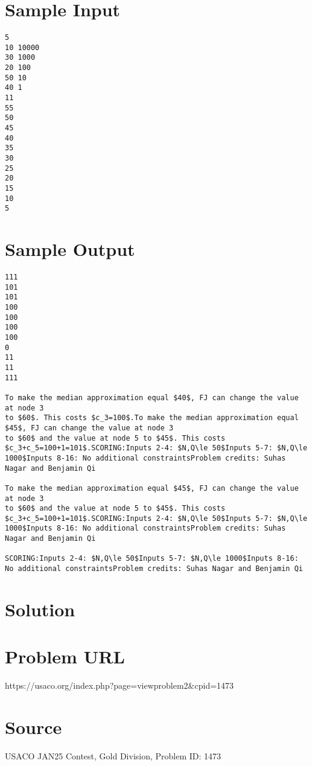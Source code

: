 \documentclass[12pt]{article}
\begin{document}
\section*{Sample Input}
\begin{verbatim}
5
10 10000
30 1000
20 100
50 10
40 1
11
55
50
45
40
35
30
25
20
15
10
5
\end{verbatim}

\section*{Sample Output}
\begin{verbatim}
111
101
101
100
100
100
100
0
11
11
111

To make the median approximation equal $40$, FJ can change the value at node 3
to $60$. This costs $c_3=100$.To make the median approximation equal $45$, FJ can change the value at node 3
to $60$ and the value at node 5 to $45$. This costs $c_3+c_5=100+1=101$.SCORING:Inputs 2-4: $N,Q\le 50$Inputs 5-7: $N,Q\le 1000$Inputs 8-16: No additional constraintsProblem credits: Suhas Nagar and Benjamin Qi

To make the median approximation equal $45$, FJ can change the value at node 3
to $60$ and the value at node 5 to $45$. This costs $c_3+c_5=100+1=101$.SCORING:Inputs 2-4: $N,Q\le 50$Inputs 5-7: $N,Q\le 1000$Inputs 8-16: No additional constraintsProblem credits: Suhas Nagar and Benjamin Qi

SCORING:Inputs 2-4: $N,Q\le 50$Inputs 5-7: $N,Q\le 1000$Inputs 8-16: No additional constraintsProblem credits: Suhas Nagar and Benjamin Qi
\end{verbatim}

\section*{Solution}


\section*{Problem URL}
https://usaco.org/index.php?page=viewproblem2&cpid=1473

\section*{Source}
USACO JAN25 Contest, Gold Division, Problem ID: 1473
\end{document}
